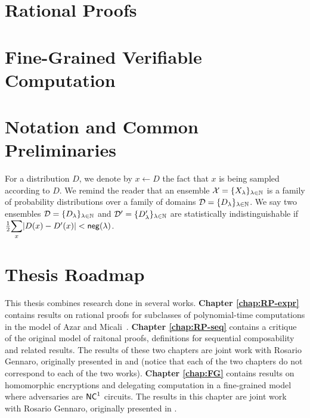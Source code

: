 \section{Rational Proofs}




\section{Fine-Grained Verifiable Computation}



\section{Notation and Common Preliminaries}

For a distribution $D$, we denote by $x \gets D$ the fact that $x$ is being sampled according to $D$.
We remind the reader that an ensemble $\mathcal{X} = \{X_{\lambda}\}_{\lambda\in\mathbb{N}}$ is a family of  probability distributions over a family of domains $\mathcal{D}=\{D_{\lambda}\}_{\lambda\in\mathbb{N}}$. We say two ensembles $\mathcal{D} = \{D_{\lambda}\}_{\lambda\in\mathbb{N}}$ and $\mathcal{D}' = \{D'_{\lambda}\}_{\lambda\in\mathbb{N}}$ are statistically indistinguishable if $\frac{1}{2}\Sum_x |D(x)-D'(x)| < \negl(\lambda)$. 


\section{Thesis Roadmap} 
This thesis combines research done in several works.
\textbf{Chapter \ref{chap:RP-expr}} contains results on rational proofs for subclasses of polynomial-time computations in the model of Azar and Micali~\cite{am}. 
\textbf{Chapter \ref{chap:RP-seq}} contains a critique of the original model of raitonal proofs, definitions for sequential composability and related results. The results of these two chapters are joint work with Rosario Gennaro, originally presented in \cite{cg15} and \cite{cg17} (notice that each of the two chapters do not correspond to each of the two works).
\textbf{Chapter \ref{chap:FG}} contains results on homomorphic encryptions and delegating computation in a fine-grained model where adversaries are ${\mathsf{NC}}^1$ circuits.
 The results in this chapter are joint work with Rosario Gennaro, originally presented in \cite{cg18}.


